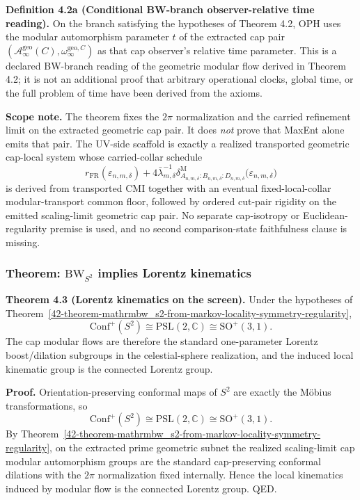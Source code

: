 \textbf{Definition 4.2a (Conditional BW-branch observer-relative time reading).}
On the branch satisfying the hypotheses of Theorem 4.2, OPH uses the modular automorphism
parameter \(t\) of the extracted cap pair
\((\mathcal A_\infty^{\mathrm{geo}}(C),\omega_\infty^{\mathrm{geo},C})\) as that cap
observer's relative time parameter. This is a declared BW-branch reading of the geometric
modular flow derived in Theorem 4.2; it is not an additional proof that arbitrary operational
clocks, global time, or the full problem of time have been derived from the axioms.

\textbf{Scope note.} The theorem fixes the \(2\pi\) normalization and the carried refinement limit on the extracted geometric cap pair. It does \emph{not} prove that MaxEnt alone emits that pair. The UV-side scaffold is exactly a realized transported geometric cap-local system whose carried-collar schedule
\[
r_{\mathrm{FR}}(\varepsilon_{n,m,\delta})
+
4\bar\lambda_{m,\delta}^{-1}
\delta^{\mathrm{M}}_{A_{n,m,\delta}:B_{n,m,\delta}:D_{n,m,\delta}}
\bigl(\varepsilon_{n,m,\delta}\bigr)
\]
is derived from transported CMI together with an eventual fixed-local-collar modular-transport common floor, followed by ordered cut-pair rigidity on the emitted scaling-limit geometric cap pair. No separate cap-isotropy or Euclidean-regularity premise is used, and no second comparison-state faithfulness clause is missing.
\subsubsection{\texorpdfstring{Theorem: \(\mathrm{BW}_{S^2}\) implies Lorentz kinematics}{4.3 Theorem: \textbackslash mathrm\{BW\}\_\{S\^{}2\} implies Lorentz kinematics}}\label{43-theorem-mathrmbw_s2-implies-lorentz-kinematics}

\textbf{Theorem 4.3 (Lorentz kinematics on the screen).} Under the hypotheses of Theorem~\ref{42-theorem-mathrmbw_s2-from-markov-locality-symmetry-regularity},
\[
\mathrm{Conf}^+(S^2)\cong \mathrm{PSL}(2,\mathbb C)\cong \mathrm{SO}^+(3,1).
\]
The cap modular flows are therefore the standard one-parameter Lorentz boost/dilation subgroups in the celestial-sphere realization, and the induced local kinematic group is the connected Lorentz group.

\textbf{Proof.} Orientation-preserving conformal maps of \(S^2\) are exactly the M\"obius transformations, so
\[
\mathrm{Conf}^+(S^2)\cong \mathrm{PSL}(2,\mathbb C)\cong \mathrm{SO}^+(3,1).
\]
By Theorem~\ref{42-theorem-mathrmbw_s2-from-markov-locality-symmetry-regularity}, on the extracted prime geometric subnet the realized scaling-limit cap modular automorphism groups are the standard cap-preserving conformal dilations with the \(2\pi\) normalization fixed internally. Hence the local kinematics induced by modular flow is the connected Lorentz group. QED.
